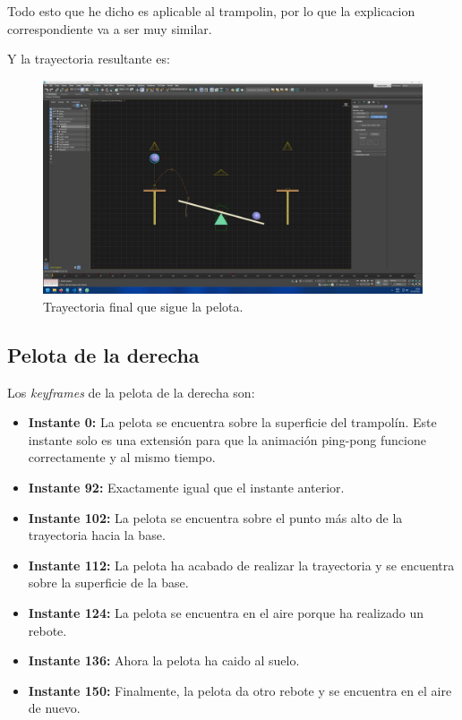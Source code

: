 \documentclass{article}
\begin{document}
\bigskip

Todo esto que he dicho es aplicable al trampolin, por lo que la explicacion correspondiente va a ser muy similar.

Y la trayectoria resultante es:

\begin{figure}[H]
    \centering
    \includegraphics[width=\textwidth]{imagenes/animaciones/PL/pelota/motionpath.png}
    \caption{Trayectoria final que sigue la pelota.}
 \end{figure}


\subsection{Pelota de la derecha}
Los \textit{keyframes} de la pelota de la derecha son:

\begin{itemize}
    \item \textbf{Instante 0: }La pelota se encuentra sobre la superficie del trampolín. Este instante solo es una extensión para que la animación ping-pong funcione correctamente y al mismo tiempo.
    \item \textbf{Instante 92: }Exactamente igual que el instante anterior.
    \item \textbf{Instante 102: }La pelota se encuentra sobre el punto más alto de la trayectoria hacia la base.
    \item \textbf{Instante 112: }La pelota ha acabado de realizar la trayectoria y se encuentra sobre la superficie de la base.
    \item \textbf{Instante 124: }La pelota se encuentra en el aire porque ha realizado un rebote.
    \item \textbf{Instante 136: }Ahora la pelota ha caido al suelo.
    \item \textbf{Instante 150: }Finalmente, la pelota da otro rebote y se encuentra en el aire de nuevo.
\end{itemize}
\end{document}
